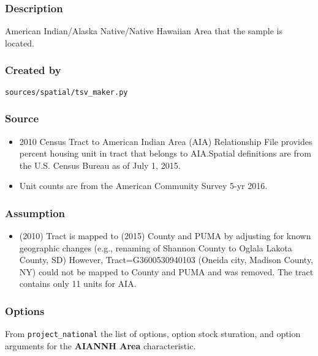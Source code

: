 \subsubsection{Description}\label{description-1}

American Indian/Alaska Native/Native Hawaiian Area that the sample is
located.

\subsubsection{Created by}\label{created-by-1}

\texttt{sources/spatial/tsv\_maker.py}

\subsubsection{Source}\label{source-1}

\begin{itemize}
%  
\item
  2010 Census Tract to American Indian Area (AIA) Relationship File
  provides percent housing unit in tract that belongs to AIA.Spatial
  definitions are from the U.S. Census Bureau as of July 1, 2015.
\item
  Unit counts are from the American Community Survey 5-yr 2016.
\end{itemize}

\subsubsection{Assumption}\label{assumption}

\begin{itemize}
%  
\item
  (2010) Tract is mapped to (2015) County and PUMA by adjusting for
  known geographic changes (e.g., renaming of Shannon County to Oglala
  Lakota County, SD) However, Tract=G3600530940103 (Oneida city, Madison
  County, NY) could not be mapped to County and PUMA and was removed.
  The tract contains only 11 units for AIA.
\end{itemize}

\subsubsection{Options}\label{options-1}

From \texttt{project\_national} the list of options, option stock
sturation, and option arguments for the \textbf{AIANNH Area}
characteristic.

